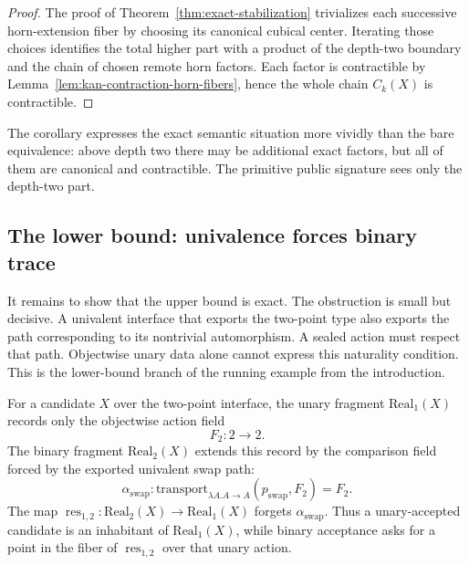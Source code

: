 \documentclass{lmcs}
\newcommand{\Real}{\mathrm{Real}}
\newcommand{\res}{\operatorname{res}}
\begin{document}
\begin{proof}
The proof of Theorem~\ref{thm:exact-stabilization} trivializes each successive horn-extension
fiber by choosing its canonical cubical center.  Iterating those choices identifies the total
higher part with a product of the depth-two boundary and the chain of chosen remote horn
factors.  Each factor is contractible by Lemma~\ref{lem:kan-contraction-horn-fibers}, hence
the whole chain \(C_k(X)\) is contractible.
\end{proof}

The corollary expresses the exact semantic situation more vividly than the bare equivalence:
above depth two there may be additional exact factors, but all of them are canonical and
contractible.  The primitive public signature sees only the depth-two part.

\subsection{The lower bound: univalence forces binary trace}
\label{subsec:swap-lower-bound}

It remains to show that the upper bound is exact.  The obstruction is small but decisive.
A univalent interface that exports the two-point type also exports the path corresponding to
its nontrivial automorphism.  A sealed action must respect that path.  Objectwise unary data
alone cannot express this naturality condition.  This is the lower-bound branch of the
running example from the introduction.

\begin{defi}
\label{def:swap-unary-binary-fragments}
For a candidate \(X\) over the two-point interface, the unary fragment
\(\Real_1(X)\) records only the objectwise action field
\[
  F_2:2\to 2.
\]
The binary fragment \(\Real_2(X)\) extends this record by the comparison field forced by the
exported univalent swap path:
\[
  \alpha_{\mathrm{swap}}:
  \mathrm{transport}_{\lambda A. A\to A}(p_{\mathrm{swap}},F_2)=F_2.
\]
The map \(\res_{1,2}:\Real_2(X)\to\Real_1(X)\) forgets
\(\alpha_{\mathrm{swap}}\).  Thus a unary-accepted candidate is an inhabitant of
\(\Real_1(X)\), while binary acceptance asks for a point in the fiber of
\(\res_{1,2}\) over that unary action.
\end{defi}
\end{document}
